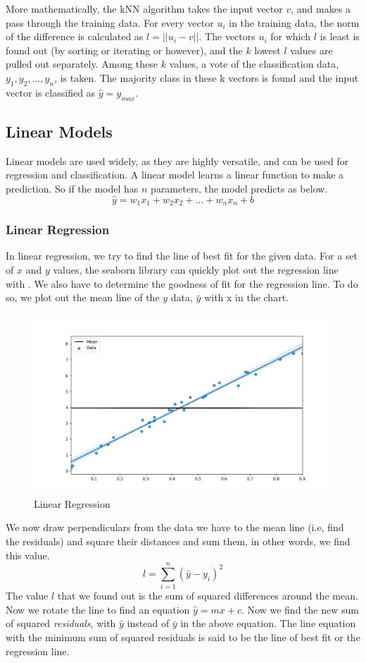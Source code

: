 \documentclass{article}
\newcommand{\code}[1]{{\fontfamily{zi4} \selectfont{#1}}}
\begin{document}
More mathematically, the kNN algorithm takes the input vector $v$, and makes a pass through the training data. For every vector $u_i$ in the training data, the norm of the difference is calculated as $l = ||u_i - v||$. The vectors $u_i$ for which $l$ is least is found out (by sorting or iterating or however), and the $k$ lowest $l$ values are pulled out separately. Among these $k$ values, a vote of the classification data, $y_1, y_2, ..., y_n$, is taken. The majority class in these k vectors is found and the input vector is classified as $\hat{y} = y_{max}$.

\clearpage
\subsection{Linear Models}

Linear models are used widely, as they are highly versatile, and can be used for regression and classification. A linear model learns a linear function to make a prediction. So if the model has $n$ parameters, the model predicts as below.
$$\hat{y} = w_1 x_1 + w_2 x_2 + ... + w_n x_n + b$$

\subsubsection{Linear Regression}
In linear regression, we try to find the line of best fit for the given data. For a set of $x$ and $y$ values, the seaborn library can quickly plot out the regression line with \code{sns.regplot(x, y)}. We also have to determine the goodness of fit for the regression line. To do so, we plot out the mean line of the $y$ data, $\bar{y}$ with x in the chart. 

\begin{figure}[H]
\includegraphics[width=0.7\linewidth]{Images/linear_reg.png}
\centering
\caption{Linear Regression}
\end{figure}

We now draw perpendiculars from the data we have to the mean line (i.e, find the residuals) and square their distances and sum them, in other words, we find this value.
$$l = \sum_{i=1}^n (\bar{y} - y_i)^2$$
The value $l$ that we found out is the sum of squared differences around the mean. Now we rotate the line to find an equation $\hat{y} = mx + c$. Now we find the new sum of squared \textit{residuals}, with $\hat{y}$ instead of $\bar{y}$ in the above equation. The line equation with the minimum sum of squared residuals is said to be the line of best fit or the regression line.
\end{document}

